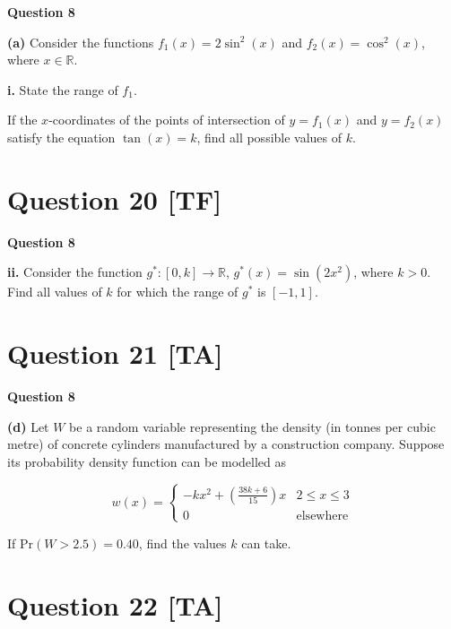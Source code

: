 \documentclass[12pt,a4paper]{article}
\begin{document}
\textbf{Question 8}

\textbf{(a)} Consider the functions $f_1(x) = 2\sin^2(x)$ and $f_2(x) = \cos^2(x)$, where $x \in \mathbb{R}$.

\textbf{i.} State the range of $f_1$.

\vspace{5\baselineskip}

If the $x$-coordinates of the points of intersection of $y = f_1(x)$ and $y = f_2(x)$ satisfy the equation $\tan(x) = k$, find all possible values of $k$.

\vspace{5\baselineskip}

\hrulefill

\section*{Question 20 [TF]}

\textbf{Question 8}

\textbf{ii.} Consider the function $g^* : [0,k] \to \mathbb{R}$, $g^*(x) = \sin(2x^2)$, where $k > 0$. Find all values of $k$ for which the range of $g^*$ is $[-1,1]$.

\vspace{5\baselineskip}

\hrulefill

\section*{Question 21 [TA]}

\textbf{Question 8}

\textbf{(d)} Let $W$ be a random variable representing the density (in tonnes per cubic metre) of concrete cylinders manufactured by a construction company. Suppose its probability density function can be modelled as

\[
w(x) = \begin{cases}
-kx^2 + \left(\frac{38k + 6}{15}\right)x & 2 \leq x \leq 3\\
0 & \text{elsewhere}
\end{cases}
\]

If $\text{Pr}(W > 2.5) = 0.40$, find the values $k$ can take.

\vspace{5\baselineskip}

\section*{Question 22 [TA]}
\end{document}
